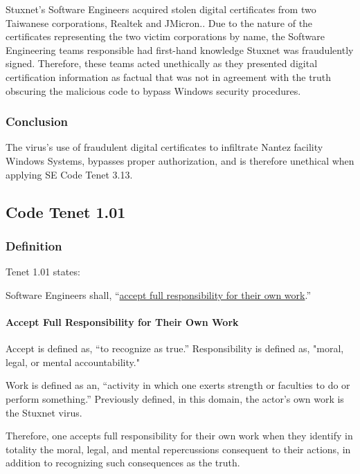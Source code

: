\documentclass[12pt]{article}
\begin{document}
\begin{multicols}{2}
Stuxnet's Software Engineers acquired stolen digital certificates from two Taiwanese corporations, Realtek and JMicron.\cite{signedUsingCertificates}. Due to the nature of the certificates representing the two victim corporations by name, the Software Engineering teams responsible had first-hand knowledge Stuxnet was fraudulently signed. Therefore, these teams acted unethically as they presented digital certification information as factual that was not in agreement with the truth obscuring the malicious code to bypass Windows security procedures.

\subsubsection{Conclusion}

The virus's use of fraudulent digital certificates to infiltrate Nantez facility Windows Systems, bypasses proper authorization, and is therefore unethical when applying SE Code Tenet 3.13.\newpage

\subsection{Code Tenet 1.01}

\subsubsection{Definition}

Tenet 1.01 states:

\begin{framed}
Software Engineers shall, ``\ul{accept full responsibility for their own work}.''\cite{softwareEngineeringCodeOfEthics}
\end{framed}

\paragraph{Accept Full Responsibility for Their Own Work}

Accept is defined as, ``to recognize as true.''\cite{merriamWebsterDefinitions} Responsibility is defined as, "moral, legal, or mental accountability."\cite{merriamWebsterDefinitions}

Work is defined as an, ``activity in which one exerts strength or faculties to do or perform something.''\cite{cambridgeDictionary} Previously defined, in this domain, the actor's own work is the Stuxnet virus.

Therefore, one accepts full responsibility for their own work when they identify in totality the moral, legal, and mental repercussions consequent to their actions, in addition to recognizing such consequences as the truth.\cite{cambridgeDictionary}


\end{multicols}
\end{document}
